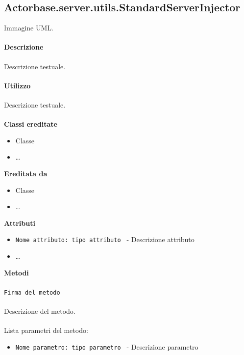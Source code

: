 \documentclass[a4paper]{article}
\begin{document}
	\subsection{Actorbase.server.utils.StandardServerInjector}
		Immagine UML.
		\\ \\
		\textbf{Descrizione}
			\\ \\
			Descrizione testuale.
			\\ \\
		\textbf{Utilizzo}
			\\ \\
			Descrizione testuale.
			\\ \\
		\textbf{Classi ereditate}
			\begin{itemize}
				\item Classe
				\item \dots
			\end{itemize}
		\textbf{Ereditata da}
			\begin{itemize}
				\item Classe
				\item \dots
			\end{itemize}
		\textbf{Attributi}
			\begin{itemize}
				\item \texttt{Nome attributo: tipo attributo } - Descrizione attributo
				\item \dots
			\end{itemize}
		\textbf{Metodi}
			\\ \\
			\texttt{Firma del metodo}
			\\ \\
			Descrizione del metodo.
			\\ \\
			Lista parametri del metodo:
			\begin{itemize}
				\item \texttt{Nome parametro: tipo parametro } - Descrizione parametro
			\end{itemize}
			
\end{document}
